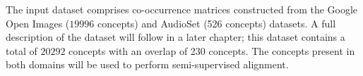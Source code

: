 The input dataset comprises co-occurrence matrices constructed from the Google Open Images ($19996$ concepts) \cite{openimages} and AudioSet (526 concepts) \cite{audioset} datasets. A full description of the dataset will follow in a later chapter; this dataset contains a total of $20292$ concepts with an overlap of 230 concepts. The concepts present in both domains will be used to perform semi-supervised alignment. 















